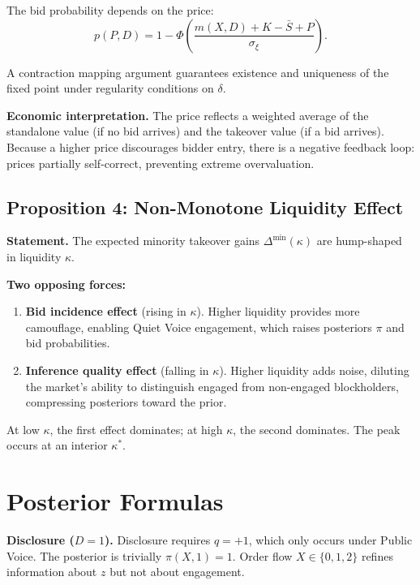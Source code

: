 \documentclass[11pt,a4paper]{article}
\newcommand{\1}{\mathbf{1}}
\begin{document}
The bid probability depends on the price:
\[
p(P, D) = 1 - \Phi\!\left(\frac{m(X,D) + K - \bar{S} + P}{\sigma_\xi}\right).
\]

A contraction mapping argument guarantees existence and uniqueness of
the fixed point under regularity conditions on $\delta$.

\textbf{Economic interpretation.}
The price reflects a weighted average of the standalone value
(if no bid arrives) and the takeover value (if a bid arrives).
Because a higher price discourages bidder entry, there is a negative
feedback loop: prices partially self-correct, preventing extreme
overvaluation.

\subsection{Proposition 4: Non-Monotone Liquidity Effect}

\textbf{Statement.}
The expected minority takeover gains
$\Delta^{\min}(\kappa)$ are hump-shaped in liquidity $\kappa$.

\textbf{Two opposing forces:}
\begin{enumerate}
\item \textbf{Bid incidence effect} (rising in $\kappa$).
  Higher liquidity provides more camouflage, enabling Quiet Voice
  engagement, which raises posteriors $\pi$ and bid probabilities.
\item \textbf{Inference quality effect} (falling in $\kappa$).
  Higher liquidity adds noise, diluting the market's ability to
  distinguish engaged from non-engaged blockholders, compressing
  posteriors toward the prior.
\end{enumerate}

At low $\kappa$, the first effect dominates; at high $\kappa$, the
second dominates. The peak occurs at an interior $\kappa^*$.


\section{Posterior Formulas}

\textbf{Disclosure ($D=1$).}
Disclosure requires $q = +1$, which only occurs under Public Voice.
The posterior is trivially $\pi(X, 1) = 1$. Order flow $X \in \{0,1,2\}$
refines information about $z$ but not about engagement.
\end{document}
